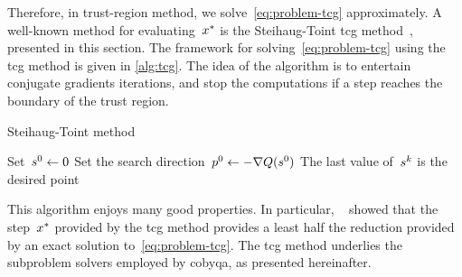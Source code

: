 Therefore, in trust-region method, we solve~\cref{eq:problem-tcg} approximately.
A well-known method for evaluating~$\iter[\ast]$ is the Steihaug-Toint \gls{tcg} method~\cite{Steihaug_1983,Toint_1981}, presented in this section.
The framework for solving~\cref{eq:problem-tcg} using the \gls{tcg} method is given in \cref{alg:tcg}.
The idea of the algorithm is to entertain conjugate gradients iterations, and stop the computations if a step reaches the boundary of the trust region.

\begin{algorithm}
    \caption{Steihaug-Toint  method}
    \label{alg:tcg}
    \DontPrintSemicolon
    \onehalfspacing
    Set~$\sstep[0] \gets 0$\;
    Set the search direction~$\pstep[0] \gets -\nabla Q(\sstep[0])$\;
    The last value of~$\sstep[k]$ is the desired point\;
\end{algorithm}

This algorithm enjoys many good properties.
In particular, \citeauthor{Yuan_2000}~\cite{Yuan_2000} showed that the step~$\iter[\ast]$ provided by the \gls{tcg} method provides a least half the reduction provided by an exact solution to~\cref{eq:problem-tcg}.
The \gls{tcg} method underlies the subproblem solvers employed by \gls{cobyqa}, as presented hereinafter.

